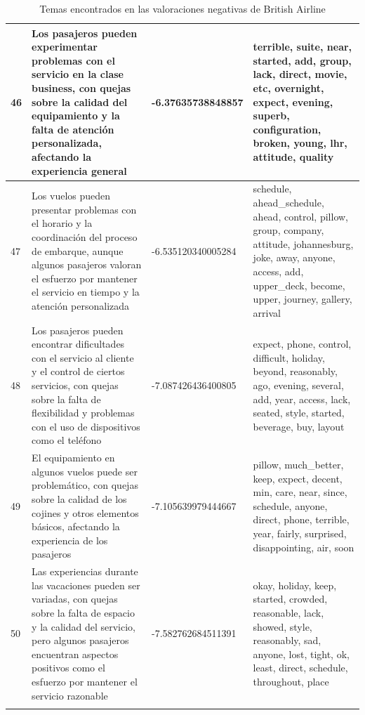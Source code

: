 \documentclass{report}
\begin{document}
{\begin{longtable}{|p{1cm}|p{4cm}|p{4cm}|p{6cm}|}
                    \hline
                    46 & Los pasajeros pueden experimentar problemas con el servicio en la clase business, con quejas sobre la calidad del equipamiento y la falta de atención personalizada, afectando la experiencia general & -6.37635738848857 & terrible, suite, near, started, add, group, lack, direct, movie, etc, overnight, expect, evening, superb, configuration, broken, young, lhr, attitude, quality \\
                    \hline
                    47 & Los vuelos pueden presentar problemas con el horario y la coordinación del proceso de embarque, aunque algunos pasajeros valoran el esfuerzo por mantener el servicio en tiempo y la atención personalizada & -6.535120340005284 & schedule, ahead\_schedule, ahead, control, pillow, group, company, attitude, johannesburg, joke, away, anyone, access, add, upper\_deck, become, upper, journey, gallery, arrival \\
                    \hline
                    48 & Los pasajeros pueden encontrar dificultades con el servicio al cliente y el control de ciertos servicios, con quejas sobre la falta de flexibilidad y problemas con el uso de dispositivos como el teléfono & -7.087426436400805 & expect, phone, control, difficult, holiday, beyond, reasonably, ago, evening, several, add, year, access, lack, seated, style, started, beverage, buy, layout \\
                    \hline
                    49 & El equipamiento en algunos vuelos puede ser problemático, con quejas sobre la calidad de los cojines y otros elementos básicos, afectando la experiencia de los pasajeros & -7.105639979444667 & pillow, much\_better, keep, expect, decent, min, care, near, since, schedule, anyone, direct, phone, terrible, year, fairly, surprised, disappointing, air, soon \\
                    \hline
                    50 & Las experiencias durante las vacaciones pueden ser variadas, con quejas sobre la falta de espacio y la calidad del servicio, pero algunos pasajeros encuentran aspectos positivos como el esfuerzo por mantener el servicio razonable & -7.582762684511391 & okay, holiday, keep, started, crowded, reasonable, lack, showed, style, reasonably, sad, anyone, lost, tight, ok, least, direct, schedule, throughout, place \\
                    \hline
                    \caption{Temas encontrados en las valoraciones negativas de British Airline}
                \end{longtable}
}
\end{document}
